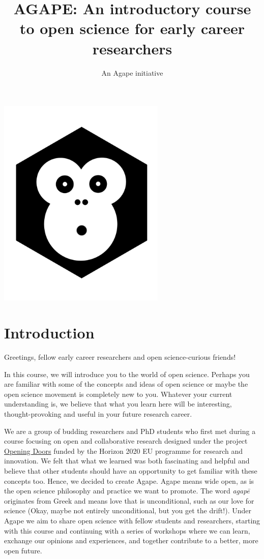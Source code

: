 \documentclass[
]{book}
\title{AGAPE: An introductory course to open science for early career researchers}
\author{An Agape initiative}
\date{}
\begin{document}
\maketitle

{
\setcounter{tocdepth}{1}
\tableofcontents
}
\includegraphics[width=0.6\textwidth,height=\textheight]{images/agapecover.png}

\hypertarget{introduction}{%
\chapter*{Introduction}\label{introduction}}

Greetings, fellow early career researchers and open science-curious friends!

In this course, we will introduce you to the world of open science. Perhaps you are familiar with some of the concepts and ideas of open science or maybe the open science movement is completely new to you. Whatever your current understanding is, we believe that what you learn here will be interesting, thought-provoking and useful in your future research career.

We are a group of budding researchers and PhD students who first met during a course focusing on open and collaborative research designed under the project {\href{https://openingdoors4phd.eu/project.html}{Opening Doors}} funded by the Horizon 2020 EU programme for research and innovation. We felt that what we learned was both fascinating and helpful and believe that other students should have an opportunity to get familiar with these concepts too. Hence, we decided to create Agape. Agape means wide open, as is the open science philosophy and practice we want to promote. The word \emph{agapē} originates from Greek and means love that is unconditional, such as our love for science (Okay, maybe not entirely unconditional, but you get the drift!). Under Agape we aim to share open science with fellow students and researchers, starting with this course and continuing with a series of workshops where we can learn, exchange our opinions and experiences, and together contribute to a better, more open future.
\end{document}
